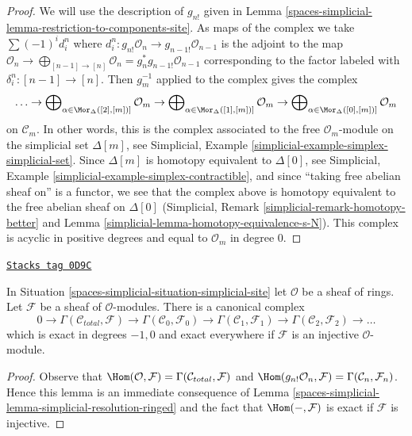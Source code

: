 \begin{proof}
We will use the description of $g_{n!}$ given in
Lemma \ref{spaces-simplicial-lemma-restriction-to-components-site}.
As maps of the complex we take $\sum (-1)^i d^n_i$ where
$d^n_i : g_{n!}\mathcal{O}_n \to g_{n - 1!}\mathcal{O}_{n - 1}$
is the adjoint to the map
$\mathcal{O}_n \to \bigoplus_{[n - 1] \to [n]} \mathcal{O}_n =
g_n^*g_{n - 1!}\mathcal{O}_{n - 1}$
corresponding to the factor labeled with $\delta^n_i : [n - 1] \to [n]$.
Then $g_m^{-1}$ applied to the complex gives the complex
$$
\ldots \to
\bigoplus\nolimits_{\alpha \in \Mor_\Delta([2], [m])]} \mathcal{O}_m \to
\bigoplus\nolimits_{\alpha \in \Mor_\Delta([1], [m])]} \mathcal{O}_m \to
\bigoplus\nolimits_{\alpha \in \Mor_\Delta([0], [m])]} \mathcal{O}_m
$$
on $\mathcal{C}_m$.
In other words, this is the complex associated to the
free $\mathcal{O}_m$-module on the simplicial set $\Delta[m]$, see
Simplicial, Example \ref{simplicial-example-simplex-simplicial-set}.
Since $\Delta[m]$ is homotopy equivalent to $\Delta[0]$, see
Simplicial, Example \ref{simplicial-example-simplex-contractible},
and since ``taking free abelian sheaf on'' is a functor,
we see that the complex above is homotopy equivalent to
the free abelian sheaf on $\Delta[0]$
(Simplicial, Remark \ref{simplicial-remark-homotopy-better} and
Lemma \ref{simplicial-lemma-homotopy-equivalence-s-N}).
This complex is acyclic in positive degrees
and equal to $\mathcal{O}_m$ in degree $0$.
\end{proof}

\begin{lemma}
\label{spaces-simplicial-lemma-cech-complex-modules}
\href{https://stacks.math.columbia.edu/tag/0D9C}{\texttt{Stacks tag 0D9C}}

In Situation \ref{spaces-simplicial-situation-simplicial-site} let $\mathcal{O}$
be a sheaf of rings. Let $\mathcal{F}$ be a
sheaf of $\mathcal{O}$-modules. There is a canonical complex
$$
0 \to \Gamma(\mathcal{C}_{total}, \mathcal{F}) \to
\Gamma(\mathcal{C}_0, \mathcal{F}_0) \to
\Gamma(\mathcal{C}_1, \mathcal{F}_1) \to
\Gamma(\mathcal{C}_2, \mathcal{F}_2) \to \ldots
$$
which is exact in degrees $-1, 0$ and exact everywhere
if $\mathcal{F}$ is an injective $\mathcal{O}$-module.
\end{lemma}

\begin{proof}
Observe that
$\Hom(\mathcal{O}, \mathcal{F}) = \Gamma(\mathcal{C}_{total}, \mathcal{F})$
and
$\Hom(g_{n!}\mathcal{O}_n, \mathcal{F}) = \Gamma(\mathcal{C}_n, \mathcal{F}_n)$.
Hence this lemma is an immediate consequence of
Lemma \ref{spaces-simplicial-lemma-simplicial-resolution-ringed}
and the fact that $\Hom(-, \mathcal{F})$ is exact if
$\mathcal{F}$ is injective.
\end{proof}

